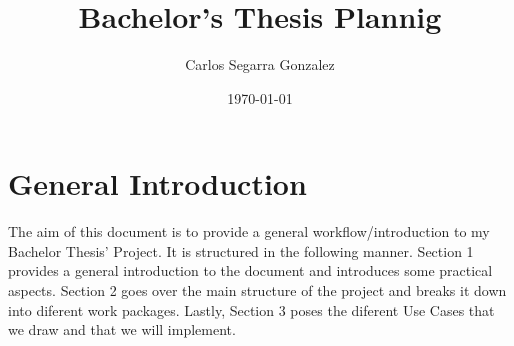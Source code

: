 \documentclass{article}
\begin{document}
\onehalfspacing

\title{Bachelor's Thesis Plannig}
\author{Carlos Segarra Gonzalez}
\date{\today}

\maketitle
\tableofcontents

\section{General Introduction}
The aim of this document is to provide a general workflow/introduction to my Bachelor Thesis' Project. It is structured in the following manner. Section 1 provides a general introduction to the document and introduces some practical aspects. Section 2 goes over the main structure of the project and breaks it down into diferent work packages. Lastly, Section 3 poses the diferent Use Cases that we draw and that we will implement.
\end{document}
